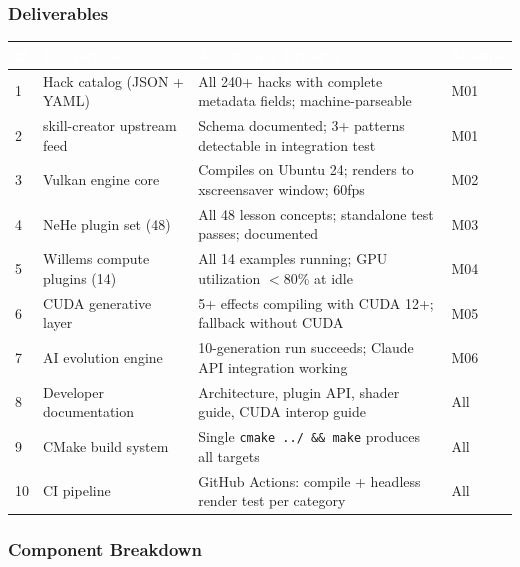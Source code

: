 \documentclass[11pt,letterpaper]{article}
\newcommand{\tableheader}[1]{\textbf{\sffamily\textcolor{white}{#1}}}
\begin{document}
\subsubsection{Deliverables}

\begin{center}
\begin{tabularx}{\textwidth}{C{0.5cm}L{4cm}XC{2cm}}
\toprule
{}
\tableheader{\#} & \tableheader{Deliverable} & \tableheader{Acceptance Criteria} & \tableheader{Module} \\
 & Hack catalog (JSON + YAML) & All 240+ hacks with complete metadata fields; machine-parseable & M01 \\
2 & skill-creator upstream feed & Schema documented; 3+ patterns detectable in integration test & M01 \\
3 & Vulkan engine core & Compiles on Ubuntu 24; renders to xscreensaver window; 60fps & M02 \\
4 & NeHe plugin set (48) & All 48 lesson concepts; standalone test passes; documented & M03 \\
5 & Willems compute plugins (14) & All 14 examples running; GPU utilization $<$80\% at idle & M04 \\
6 & CUDA generative layer & 5+ effects compiling with CUDA 12+; fallback without CUDA & M05 \\
7 & AI evolution engine & 10-generation run succeeds; Claude API integration working & M06 \\
8 & Developer documentation & Architecture, plugin API, shader guide, CUDA interop guide & All \\
9 & CMake build system & Single \texttt{cmake ../ \&\& make} produces all targets & All \\
10 & CI pipeline & GitHub Actions: compile + headless render test per category & All \\
\bottomrule
\end{tabularx}
\end{center}

\subsubsection{Component Breakdown}
\end{document}
